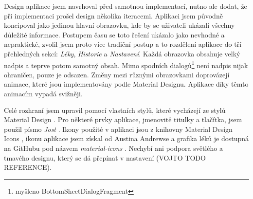 \documentclass[../TakeYourPill.tex]{subfiles}
\begin{document}
Design aplikace jsem navrhoval před samotnou implementací, nutno ale dodat, že při implementaci prošel design několika iteracemi. Aplikaci jsem původně koncipoval jako jedinou hlavní obrazovku, kde by se uživateli ukázali všechny důležité informace. Postupem času se toto řešení ukázalo jako nevhodné a nepraktické, zvolil jsem proto více tradiční postup a to rozdělení aplikace do tří přehledných sekcí: \textit{Léky}, \textit{Historie} a \textit{Nastavení}. Každá obrazovka obsahuje velký nadpis a teprve potom samotný obsah. Mimo spodních dialogů\footnote{myšleno BottomSheetDialogFragment} není nadpis nijak ohraničen, pouze je odsazen. Změny mezi různými obrazovkami doprovázejí animace, které jsou implementovány podle Material Designu. Aplikace díky těmto animacím vypadá svižněji.

Celé rozhraní jsem upravil pomocí vlastních stylů, které vycházejí ze stylů Material Design \cite{materialdesign}. Pro některé prvky aplikace, jmenovitě titulky a tlačítka, jsem použil písmo \textit{Jost} \cite{jost}. Ikony použité v aplikaci jsou z knihovny Material Design Icons \cite{icons}, ikonu aplikace jsem získal od Austina Andrewse \cite{pill-icon} a grafika léků je dostupná na GitHubu pod názvem \textit{material-icons} \cite{pills-icons}. Nechybí ani podpora světlého a tmavého designu, který se dá přepínat v nastavení (VOJTO TODO REFERENCE).
\end{document}

